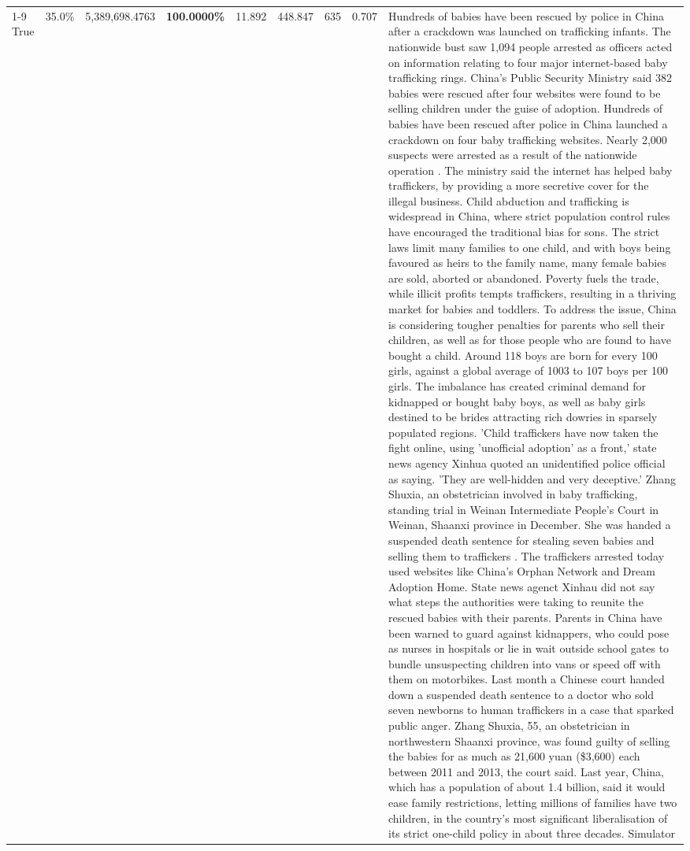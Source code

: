 \begin{table}[H]
\begin{tabular}{lllrlllll}
\cline{1-9}
True & 35.0\% & 5,389,698.4763 & \bfseries \color{red} 100.0000\% & 11.892 & 448.847 & 635 & 0.707 & Hundreds of babies have been rescued by police in China after a crackdown was launched on trafficking infants. The nationwide bust saw 1,094 people arrested as officers acted on information relating to four major internet-based baby trafficking rings. China's Public Security Ministry said 382 babies were rescued after four websites were found to be selling children under the guise of adoption. Hundreds of babies have been rescued after police in China launched a crackdown on four baby trafficking websites. Nearly 2,000 suspects were arrested as a result of the nationwide operation . The ministry said the internet has helped baby traffickers, by providing a more secretive cover for the illegal business. Child abduction and trafficking is widespread in China, where strict population control rules have encouraged the traditional bias for sons. The strict laws limit many families to one child, and with boys being favoured as heirs to the family name, many female babies are sold, aborted or abandoned. Poverty fuels the trade, while illicit profits tempts traffickers, resulting in a thriving market for babies and toddlers. To address the issue, China is considering tougher penalties for parents who sell their children, as well as for those people who are found to have bought a child. Around 118 boys are born for every 100 girls, against a global average of 1003 to 107 boys per 100 girls. The imbalance has created criminal demand for kidnapped or bought baby boys, as well as baby girls destined to be brides attracting rich dowries in sparsely populated regions. 'Child traffickers have now taken the fight online, using 'unofficial adoption' as a front,' state news agency Xinhua quoted an unidentified police official as saying. 'They are well-hidden and very deceptive.' Zhang Shuxia, an obstetrician involved in baby trafficking, standing trial in Weinan Intermediate People's Court in Weinan, Shaanxi province in December. She was handed a suspended death sentence for stealing seven babies and selling them to traffickers . The traffickers arrested today used websites like China's Orphan Network and Dream Adoption Home. State news agenct Xinhau did not say what steps the authorities were taking to reunite the rescued babies with their parents. Parents in China have been warned to guard against kidnappers, who could pose as nurses in hospitals or lie in wait outside school gates to bundle unsuspecting children into vans or speed off with them on motorbikes. Last month a Chinese court handed down a suspended death sentence to a doctor who sold seven newborns to human traffickers in a case that sparked public anger. Zhang Shuxia, 55, an obstetrician in northwestern Shaanxi province, was found guilty of selling the babies for as much as 21,600 yuan (\$3,600) each between 2011 and 2013, the court said. Last year, China, which has a population of about 1.4 billion, said it would ease family restrictions, letting millions of families have two children, in the country's most significant liberalisation of its strict one-child policy in about three decades. Simulator \\

\end{tabular}
\end{table}
